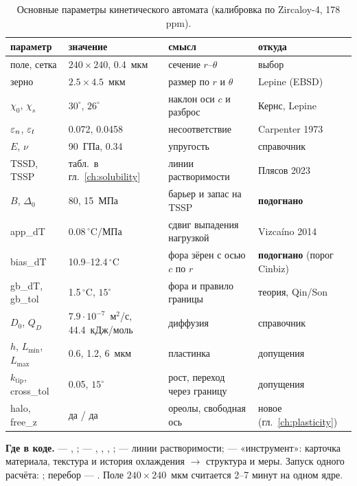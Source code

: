 \begin{table}[htbp]\centering\small
\caption{Основные параметры кинетического автомата (калибровка по Zircaloy-4, 178 ppm).}
\begin{tabular}{llll}\toprule
параметр & значение & смысл & откуда\\\midrule
поле, сетка & $240\times240$, 0.4~мкм & сечение $r$--$\theta$ & выбор\\
зерно & $2.5\times4.5$~мкм & размер по $r$ и $\theta$ & Lepine (EBSD)\\
$\chi_0$, $\chi_s$ & $30^\circ$, $26^\circ$ & наклон оси $c$ и разброс & Кернс, Lepine\\
$\varepsilon_n$, $\varepsilon_t$ & 0.072, 0.0458 & несоответствие & Carpenter 1973\\
$E$, $\nu$ & 90~ГПа, 0.34 & упругость & справочник\\
TSSD, TSSP & табл.~в гл.~\ref{ch:solubility} & линии растворимости & Плясов 2023\\
$B$, $\Delta_0$ & 80, 15~МПа & барьер и запас на TSSP & \textbf{подогнано}\\
app\_dT & $0.08\,^\circ$C/МПа & сдвиг выпадения нагрузкой & Vizcaíno 2014\\
bias\_dT & 10.9--12.4\,$^\circ$C & фора зёрен с осью $c$ по $r$ & \textbf{подогнано} (порог Cinbiz)\\
gb\_dT, gb\_tol & 1.5\,$^\circ$C, $15^\circ$ & фора и правило границы & теория, Qin/Son\\
$D_0$, $Q_D$ & $7.9\cdot10^{-7}$~м$^2$/с, 44.4~кДж/моль & диффузия & справочник\\
$h$, $L_{\min}$, $L_{\max}$ & 0.6, 1.2, 6~мкм & пластинка & допущения\\
$k_{\text{tip}}$, cross\_tol & 0.05, $15^\circ$ & рост, переход через границу & допущения\\
halo, free\_z & да / да & ореолы, свободная ось & новое (гл.~\ref{ch:plasticity})\\\bottomrule
\end{tabular}
\end{table}

\begin{codebox}
\textbf{Где в коде.}  --- , ;
 --- , , , ;
 --- линии растворимости;  --- «инструмент»: карточка материала, текстура
и история охлаждения $\to$ структура и меры. Запуск одного расчёта:
; перебор --- .
Поле $240\times240$~мкм считается 2--7 минут на одном ядре.
\end{codebox}
